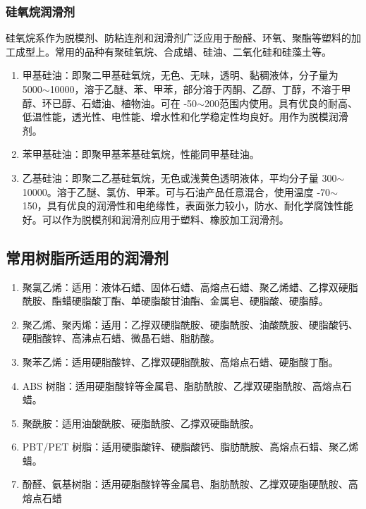 \subsubsection{硅氧烷润滑剂}
硅氧烷系作为脱模剂、防粘连剂和润滑剂广泛应用于酚醛、环氧、聚酯等塑料的加工成型上。常用的品种有聚硅氧烷、合成蜡、硅油、二氧化硅和硅藻土等。

\begin{enumerate}[(1) ]
    \item 甲基硅油：即聚二甲基硅氧烷，无色、无味，透明、黏稠液体，分子量为 5000$\sim$10000，溶于乙醚、苯、甲苯，部分溶于丙酮、乙醇、丁醇，不溶于甲醇、环已醇、石蜡油、植物油。可在 -50$\sim$200\cd 范围内使用。具有优良的耐高、低温性能，透光性、电性能、增水性和化学稳定性均良好。用作为脱模润滑剂。
    \item 苯甲基硅油：即聚甲基苯基硅氧烷，性能同甲基硅油。
    \item 乙基硅油：即聚二乙基硅氧烷，无色或浅黄色透明液体，平均分子量 300$\sim$10000。溶于乙醚、氯仿、甲苯。可与石油产品任意混合，使用温度 -70$\sim$150\cd，具有优良的润滑性和电绝缘性，表面张力较小，防水、耐化学腐蚀性能好。可以作为脱模剂和润滑剂应用于塑料、橡胶加工润滑剂。
\end{enumerate}

\subsection{常用树脂所适用的润滑剂}
\begin{enumerate}[(1) ]
    \item 聚氯乙烯：适用：液体石蜡、固体石蜡、高熔点石蜡、聚乙烯蜡、乙撑双硬脂酰胺、酯蜡硬脂酸丁酯、单硬脂酸甘油酯、金属皂、硬脂酸、硬脂醇。
    \item 聚乙烯、聚丙烯：适用：乙撑双硬脂酰胺、硬脂酰胺、油酸酰胺、硬脂酸钙、硬脂酸锌、高沸点石蜡、微晶石蜡、脂肪酸。
    \item 聚苯乙烯：适用硬脂酸锌、乙撑双硬脂酰胺、高熔点石蜡、硬脂酸丁酯。
    \item ABS 树脂：适用硬脂酸锌等金属皂、脂肪酰胺、乙撑双硬脂酰胺、高熔点石蜡。
    \item 聚酰胺：适用油酸酰胺、硬脂酰胺、乙撑双硬酯酰胺。
    \item PBT/PET 树脂：适用硬脂酸锌、硬脂酸钙、脂肪酰胺、高熔点石蜡、聚乙烯蜡。
    \item 酚醛、氨基树脂：适用硬脂酸锌等金属皂、脂肪酰胺、乙撑双硬脂硬酰胺、高熔点石蜡
\end{enumerate}
